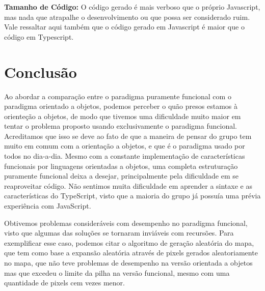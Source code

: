 \documentclass[rel_mlp]{iiufrgs}
\numberwithin{figure}{chapter}
\begin{document}
\textbf{Tamanho de Código:} O código gerado é mais verboso que o próprio Javascript, mas nada que atrapalhe o desenvolvimento ou que possa ser considerado ruim. Vale ressaltar aqui também que o código gerado em Javascript é maior que o código em Typescript.





%
\chapter{Conclusão}

Ao abordar a comparação entre o paradigma puramente funcional com o paradigma orientado a objetos, podemos perceber o quão presos estamos à orienteção a objetos, de modo que tivemos uma dificuldade muito maior em tentar o problema proposto usando exclusivamente o paradigma funcional. Acreditamos que isso se deve ao fato de que a maneira de pensar do grupo tem muito em comum com a orientação a objetos, e que é o paradigma usado por todos no dia-a-dia. Mesmo com a constante implementação de características funcionais por linguagens orientadas a objetos, uma completa estruturação puramente funcional deixa a desejar, principalmente pela dificuldade em se reaproveitar código. Não sentimos muita dificuldade em aprender a sintaxe e as características do TypeScript, visto que a maioria do grupo já possuía uma prévia experiência com JavaScript.

Obtivemos problemas consideráveis com desempenho no paradigma funcional, visto que algumas das soluções se tornaram inviáveis com recursões. Para exemplificar esse caso, podemos citar o algoritmo de geração aleatória do mapa, que tem como base a expansão aleatória através de pixels gerados aleatoriamente no mapa, que não teve problemas de desempenho na versão orientada a objetos mas que excedeu o limite da pilha na versão funcional, mesmo com uma quantidade de pixels cem vezes menor.


%

%




\end{document}
